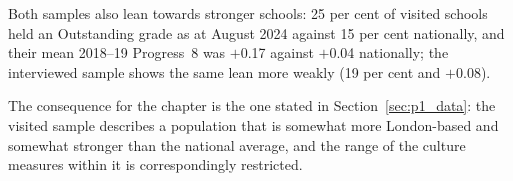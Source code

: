 Both samples also lean towards stronger schools: 25 per cent of visited schools held an
Outstanding grade as at August 2024 against 15 per cent nationally, and their mean
2018--19 Progress~8 was $+$0.17 against $+$0.04 nationally; the interviewed sample shows the
same lean more weakly (19 per cent and $+$0.08).

The consequence for the chapter is the one stated in Section~\ref{sec:p1_data}: the
visited sample describes a population that is somewhat more London-based and somewhat
stronger than the national average, and the range of the culture measures within it is
correspondingly restricted.
